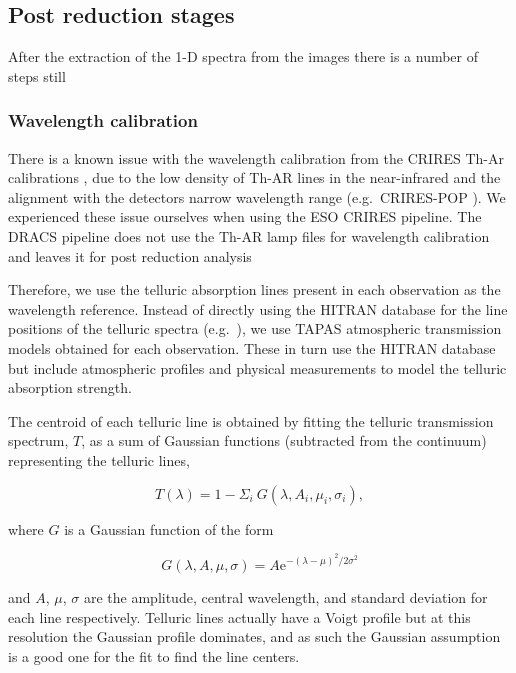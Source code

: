 \subsection{Post reduction stages}

After the extraction of the 1-D spectra from the images there is a number of steps still 

\subsubsection{Wavelength calibration}
\label{subsec:wave_cal}
There is a known issue with the wavelength calibration from the CRIRES Th-Ar calibrations \citep{kerber_laboratory_2009}, due to the low density of Th-AR lines in the near-infrared and the alignment with the detectors narrow wavelength range (e.g.\ CRIRES-POP \citep{nicholls_crirespop_2017}). We experienced these issue ourselves when using the ESO CRIRES pipeline. The DRACS pipeline does not use the Th-AR lamp files for wavelength calibration and leaves it for post reduction analysis

Therefore, we use the telluric absorption lines present in each observation as the wavelength reference. Instead of directly using the HITRAN database \citep{rothman_hitran2012_2013} for the line positions of the telluric spectra (e.g.~\citep{brogi_signature_2012,brogi_carbon_2014,dekok_detection_2013}), we use TAPAS atmospheric transmission models \citep{bertaux_tapas_2014} obtained for each observation. These in turn use the HITRAN database but include atmospheric profiles and physical measurements to model the telluric absorption strength.

The centroid of each telluric line is obtained by fitting the telluric transmission spectrum, \(T \), as a sum of Gaussian functions (subtracted from the continuum) representing the telluric lines,

\begin{equation}
T(\lambda) = 1 - {\Sigma}_{i}\ G(\lambda, A_{i}, {\mu}_{i}, {\sigma}_{i}),
\end{equation}

where \(G \) is a Gaussian function of the form

\begin{equation}
G(\lambda, A, \mu, \sigma) = {A \textrm{e}}^{{-(\lambda-\mu)}^{2}/2\sigma^{2}}
\end{equation}

and \(A \), \(\mu \), \(\sigma \) are the amplitude, central wavelength, and standard deviation for each line respectively. Telluric lines actually have a  Voigt profile but at this resolution the Gaussian profile dominates, and as such the Gaussian assumption is a good one for the fit to find the line centers.

